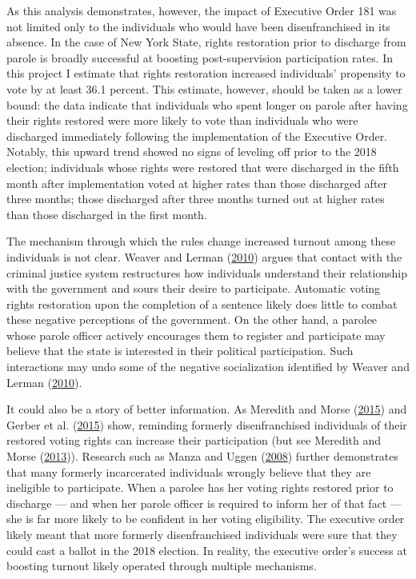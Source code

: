 \documentclass[
  12pt,
]{article}
\begin{document}
As this analysis demonstrates, however, the impact of Executive Order 181 was not limited only to the individuals who would have been disenfranchised in its absence. In the case of New York State, rights restoration prior to discharge from parole is broadly successful at boosting post-supervision participation rates. In this project I estimate that rights restoration increased individuals' propensity to vote by at least 36.1 percent. This estimate, however, should be taken as a lower bound: the data indicate that individuals who spent longer on parole after having their rights restored were more likely to vote than individuals who were discharged immediately following the implementation of the Executive Order. Notably, this upward trend showed no signs of leveling off prior to the 2018 election; individuals whose rights were restored that were discharged in the fifth month after implementation voted at higher rates than those discharged after three months; those discharged after three months turned out at higher rates than those discharged in the first month.

The mechanism through which the rules change increased turnout among these individuals is not clear. Weaver and Lerman (\protect\hyperlink{ref-Weaver2010}{2010}) argues that contact with the criminal justice system restructures how individuals understand their relationship with the government and sours their desire to participate. Automatic voting rights restoration upon the completion of a sentence likely does little to combat these negative perceptions of the government. On the other hand, a parolee whose parole officer actively encourages them to register and participate may believe that the state is interested in their political participation. Such interactions may undo some of the negative socialization identified by Weaver and Lerman (\protect\hyperlink{ref-Weaver2010}{2010}).

It could also be a story of better information. As Meredith and Morse (\protect\hyperlink{ref-Meredith2015}{2015}) and Gerber et al. (\protect\hyperlink{ref-Gerber2015}{2015}) show, reminding formerly disenfranchised individuals of their restored voting rights can increase their participation (but see Meredith and Morse (\protect\hyperlink{ref-Meredith2013}{2013})). Research such as Manza and Uggen (\protect\hyperlink{ref-locked_out}{2008}) further demonstrates that many formerly incarcerated individuals wrongly believe that they are ineligible to participate. When a parolee has her voting rights restored prior to discharge --- and when her parole officer is required to inform her of that fact --- she is far more likely to be confident in her voting eligibility. The executive order likely meant that more formerly disenfranchised individuals were sure that they could cast a ballot in the 2018 election. In reality, the executive order's success at boosting turnout likely operated through multiple mechanisms.
\end{document}
